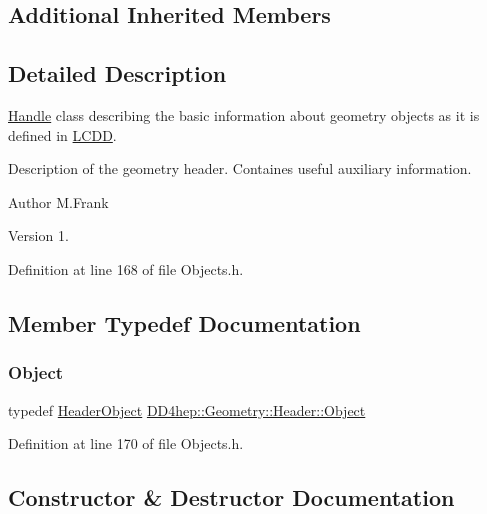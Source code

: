 \subsection*{Additional Inherited Members}


\subsection{Detailed Description}
\hyperlink{class_d_d4hep_1_1_handle}{Handle} class describing the basic information about geometry objects as it is defined in \hyperlink{class_d_d4hep_1_1_geometry_1_1_l_c_d_d}{L\+C\+DD}. 

Description of the geometry header. Containes useful auxiliary information.

\begin{DoxyAuthor}{Author}
M.\+Frank 
\end{DoxyAuthor}
\begin{DoxyVersion}{Version}
1. 
\end{DoxyVersion}


Definition at line 168 of file Objects.\+h.



\subsection{Member Typedef Documentation}
\hypertarget{class_d_d4hep_1_1_geometry_1_1_header_a8cb46876d46f57257201a561bb1e0795}{}\label{class_d_d4hep_1_1_geometry_1_1_header_a8cb46876d46f57257201a561bb1e0795} 
\subsubsection{\texorpdfstring{Object}{Object}}
{\footnotesize\ttfamily typedef \hyperlink{class_d_d4hep_1_1_geometry_1_1_header_object}{Header\+Object} \hyperlink{class_d_d4hep_1_1_geometry_1_1_header_a8cb46876d46f57257201a561bb1e0795}{D\+D4hep\+::\+Geometry\+::\+Header\+::\+Object}}



Definition at line 170 of file Objects.\+h.



\subsection{Constructor \& Destructor Documentation}
\hypertarget{class_d_d4hep_1_1_geometry_1_1_header_a577016069dd076aa2127e4ee0c60eb7c}{}\label{class_d_d4hep_1_1_geometry_1_1_header_a577016069dd076aa2127e4ee0c60eb7c} 
